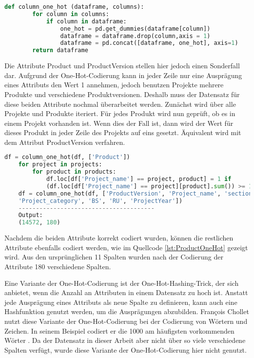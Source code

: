 \begin{lstlisting}[language = python, caption={Funktion zur One-Hot-Codierung},captionpos=b, label = lst:OneHot, floatplacement=H]
    def column_one_hot (dataframe, columns): 
        for column in columns:
            if column in dataframe:
                one_hot = pd.get_dummies(dataframe[column])
                dataframe = dataframe.drop(column,axis = 1)
                dataframe = pd.concat([dataframe, one_hot], axis=1)
        return dataframe
\end{lstlisting}

Die Attribute \glqq Product\grqq{} und \glqq ProductVersion\grqq{} stellen hier jedoch einen Sonderfall dar. Aufgrund der One-Hot-Codierung kann in jeder Zeile nur eine Ausprägung
eines Attributs den Wert 1 annehmen, jedoch benutzen Projekte mehrere Produkte und verschiedene Produktversionen. Deshalb muss der Datensatz für diese beiden Attribute nochmal 
überarbeitet werden. Zunächst wird über alle Projekte und Produkte iteriert. Für jedes Produkt wird nun geprüft, ob es in einem Projekt vorhanden ist. Wenn dies der Fall ist,
dann wird der Wert für dieses Produkt in jeder Zeile des Projekts auf eins gesetzt. Äquivalent wird mit dem Attribut \glqq ProductVersion\grqq{} verfahren. 

\begin{lstlisting}[language = python, caption={Anpassung der Spalte \glqq Product\grqq},captionpos=b, label = lst:ProductOneHot, floatplacement=H]
    df = column_one_hot(df, ['Product'])
    for project in projects:
        for product in products:
            df.loc[df['Project_name'] == project, product] = 1 if 
            (df.loc[df['Project_name'] == project][product].sum()) >= 1 else 0
    df = column_one_hot(df, ['ProductVersion', 'Project_name', 'section',
    'Project_category', 'BS', 'RU', 'ProjectYear'])
    ---------------------------------------
    Output:
    (14572, 180)
\end{lstlisting}

Nachdem die beiden Attribute korrekt codiert wurden, können die restlichen Attribute ebenfalls codiert werden, wie im Quellcode \ref*{lst:ProductOneHot} gezeigt wird.
Aus den ursprünglichen 11 Spalten wurden nach der Codierung der Attribute 180 verschiedene Spalten.

Eine Variante der One-Hot-Codierung ist der One-Hot-Hashing-Trick, der sich anbietet, wenn die Anzahl an Attributen in einem Datensatz zu hoch ist. Anstatt jede Ausprägung
eines Attributs als neue Spalte zu definieren, kann auch eine Hashfunktion genutzt werden, um die Ausprägungen abzubilden. François Chollet nutzt diese Variante
der One-Hot-Codierung bei der Codierung von Wörtern und Zeichen. In seinem Beispiel codiert er die 1000 am häufigsten vorkommenden Wörter \cite[vgl. S.236]{DL_PY}. Da der Datensatz in dieser Arbeit aber 
nicht über so viele verschiedene Spalten verfügt, wurde diese Variante der One-Hot-Codierung hier nicht genutzt.

